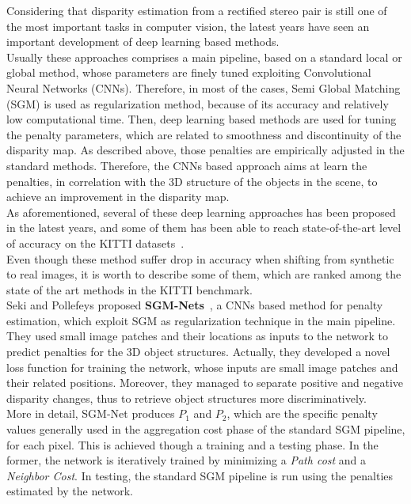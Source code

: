Considering that disparity estimation from a rectified stereo pair is still one of the most important tasks in computer vision, the latest years have seen an important development of deep learning based methods. \\
Usually these approaches comprises a main pipeline, based on a standard local or global method, whose parameters are finely tuned exploiting Convolutional Neural Networks (CNNs). 
Therefore, in most of the cases, Semi Global Matching (SGM) is used as regularization method, because of its accuracy and relatively low computational time. 
Then, deep learning based methods are used for tuning the penalty parameters, which are related to smoothness and discontinuity of the disparity map. 
As described above, those penalties are empirically adjusted in the standard methods. 
Therefore, the CNNs based approach aims at learn the penalties, in correlation with the 3D structure of the objects in the scene, to achieve an improvement in the disparity map. \\
As aforementioned, several of these deep learning approaches has been proposed in the latest years, and some of them has been able to reach state-of-the-art level of accuracy on the KITTI datasets~\cite{menze2015object}.\\
Even though these method suffer drop in accuracy when shifting from synthetic to real images, it is worth to describe some of them, which are ranked among the state of the art methods in the KITTI benchmark. \\
Seki and Pollefeys proposed \textbf{SGM-Nets}~\cite{Seki2017}, a CNNs based method for penalty estimation, which exploit SGM as regularization technique in the main pipeline. 
They used small image patches and their locations as inputs to the network to predict penalties for the 3D object structures. 
Actually, they developed a novel loss function for training the network, whose inputs are small image patches and their related positions. 
Moreover, they managed to separate positive and negative disparity changes, thus to retrieve object structures more discriminatively.\\
More in detail, SGM-Net produces $P_1$ and $P_2$, which are the specific penalty values generally used in the aggregation cost phase of the standard SGM pipeline, for each pixel. 
This is achieved though a training and a testing phase. 
In the former, the network is iteratively trained by minimizing a \textit{Path cost} and a \textit{Neighbor Cost}. 
In testing, the standard SGM pipeline is run using the penalties estimated by the network. 
